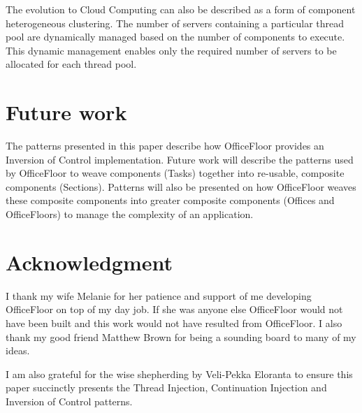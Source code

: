 \documentclass[prodmode]{style/acmlarge}
\begin{document}
The evolution to Cloud Computing can also be described as a form of component
heterogeneous clustering.  The number of servers containing a particular thread
pool are dynamically managed based on the number of components to execute.  This
dynamic management enables only the required number of servers to be allocated
for each thread pool.



\section{Future work}

The patterns presented in this paper describe how OfficeFloor \cite{officefloor}
provides an Inversion of Control implementation.  Future work will describe the
patterns used by OfficeFloor to weave components (Tasks) together into
re-usable, composite components (Sections).  Patterns will also be presented on
how OfficeFloor weaves these composite components into greater composite
components (Offices and OfficeFloors) to manage the complexity of an
application.



\section*{Acknowledgment} I thank my wife Melanie for her patience and support
of me developing OfficeFloor on top of my day job.  If she was anyone else
OfficeFloor would not have been built and this work would not have resulted from
OfficeFloor.  I also thank my good friend Matthew Brown for being a sounding
board to many of my ideas.

I am also grateful for the wise shepherding by Veli-Pekka Eloranta to ensure
this paper succinctly presents the Thread Injection, Continuation Injection and
Inversion of Control patterns.




\end{document}
